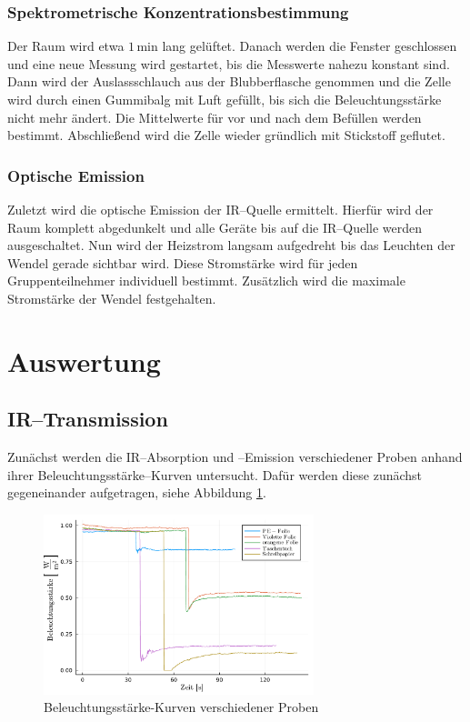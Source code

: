 \documentclass[12pt,a4paper]{scrartcl}
\numberwithin{equation}{section} %
\begin{document}
\subsubsection{Spektrometrische Konzentrationsbestimmung}
\label{howto:Spektrometrische Konzentrationsbestimmung}
Der Raum wird etwa $1\mathrm{\,min}$ lang gelüftet. Danach werden die Fenster geschlossen und eine neue Messung wird gestartet, bis die Messwerte nahezu konstant sind. Dann wird der Auslassschlauch aus der Blubberflasche genommen und die Zelle wird durch einen Gummibalg mit Luft gefüllt, bis sich die Beleuchtungsstärke nicht mehr ändert. Die Mittelwerte für vor und nach dem Befüllen werden bestimmt. Abschließend wird die Zelle wieder gründlich mit Stickstoff geflutet.

\subsubsection{Optische Emission}
\label{howto:Optische Emission}
Zuletzt wird die optische Emission der IR--Quelle ermittelt. Hierfür wird der Raum komplett abgedunkelt und alle Geräte bis auf die IR--Quelle werden ausgeschaltet. Nun wird der Heizstrom langsam aufgedreht bis das Leuchten der Wendel gerade sichtbar wird. Diese Stromstärke wird für jeden Gruppenteilnehmer individuell bestimmt. Zusätzlich wird die maximale Stromstärke der Wendel festgehalten.

\clearpage
\hypertarget{auswertung}{%
\section{Auswertung}\label{auswertung}}
\subsection{IR--Transmission}
\label{IR--Transmission}

Zunächst werden die IR--Absorption und --Emission verschiedener Proben anhand ihrer Beleuchtungsstärke--Kurven untersucht. Dafür werden diese zunächst gegeneinander aufgetragen, siehe Abbildung \ref{abb:materialien}.

\begin{figure}[h]
  \centering
  \includegraphics[width=0.7\textwidth]{../media/B1.1/materialien.pdf}
  \caption{Beleuchtungsstärke-Kurven verschiedener Proben}
  \label{abb:materialien}
\end{figure}
\end{document}
